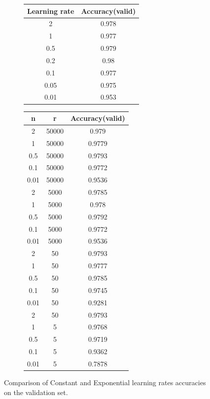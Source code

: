 \documentclass[12pt]{article}
\begin{document}
\begin{figure}[h]
\centering
\begin{subfigure}{.5\textwidth}
\centering
\begin{tabular}[h]{| c | c |}
\hline
Learning rate &  Accuracy(valid) \\
\hline 
2 & 0.978   \\
\hline
1 & 0.977   \\
\hline
0.5 & 0.979   \\
\hline
0.2 & 0.98   \\
\hline
0.1 & 0.977   \\
\hline
0.05 & 0.975   \\
\hline
0.01 & 0.953   \\
\hline
\end{tabular}
\end{subfigure}%
\begin{subfigure}{.5\textwidth}

\centering
\begin{tabular}[h]{| c | c | c |}
\hline
n & r & Accuracy(valid) \\
\hline
2 & 50000 & 0.979 \\
\hline
1 & 50000 & 0.9779 \\
\hline
0.5 & 50000 & 0.9793 \\
\hline
0.1 & 50000 & 0.9772 \\
\hline
0.01 & 50000 & 0.9536 \\
\hline
2 & 5000 & 0.9785 \\
\hline
1 & 5000 & 0.978 \\
\hline
0.5 & 5000 & 0.9792 \\
\hline
0.1 & 5000 & 0.9772 \\
\hline
0.01 & 5000 & 0.9536 \\
\hline
2 & 50 & 0.9793 \\
\hline
1 & 50 & 0.9777 \\
\hline
0.5 & 50 & 0.9785 \\
\hline
0.1 & 50 & 0.9745 \\
\hline
0.01 & 50 & 0.9281 \\
\hline
2 & 50 & 0.9793 \\
\hline
1 & 5 & 0.9768 \\
\hline
0.5 & 5 & 0.9719 \\
\hline
0.1 & 5 & 0.9362 \\
\hline
0.01 & 5 & 0.7878 \\
\hline
\end{tabular}
\end{subfigure}%

  \caption{Comparison of Constant and Exponential learning rates accuracies on the validation set.}
  \label{fig:task1_table}
\end{figure}
\end{document}
